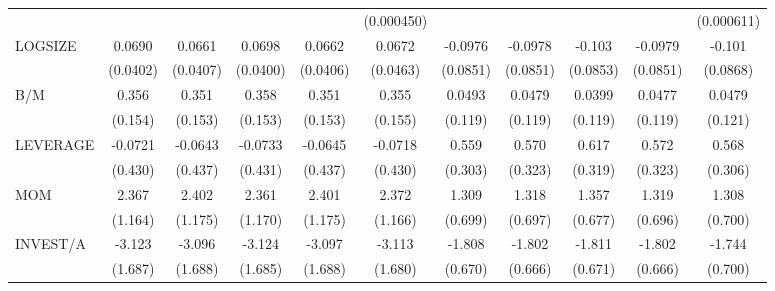 \begin{table}[htbp]
\begin{tabular}{l*{10}{c}}
                &                  &                  &                  &                  &(0.000450)         &                  &                  &                  &                  &(0.000611)         \\
LOGSIZE         &   0.0690\sym{*}  &   0.0661         &   0.0698\sym{*}  &   0.0662         &   0.0672         &  -0.0976         &  -0.0978         &   -0.103         &  -0.0979         &   -0.101         \\
                & (0.0402)         & (0.0407)         & (0.0400)         & (0.0406)         & (0.0463)         & (0.0851)         & (0.0851)         & (0.0853)         & (0.0851)         & (0.0868)         \\
B/M             &    0.356\sym{**} &    0.351\sym{**} &    0.358\sym{**} &    0.351\sym{**} &    0.355\sym{**} &   0.0493         &   0.0479         &   0.0399         &   0.0477         &   0.0479         \\
                &  (0.154)         &  (0.153)         &  (0.153)         &  (0.153)         &  (0.155)         &  (0.119)         &  (0.119)         &  (0.119)         &  (0.119)         &  (0.121)         \\
LEVERAGE        &  -0.0721         &  -0.0643         &  -0.0733         &  -0.0645         &  -0.0718         &    0.559\sym{*}  &    0.570\sym{*}  &    0.617\sym{*}  &    0.572\sym{*}  &    0.568\sym{*}  \\
                &  (0.430)         &  (0.437)         &  (0.431)         &  (0.437)         &  (0.430)         &  (0.303)         &  (0.323)         &  (0.319)         &  (0.323)         &  (0.306)         \\
MOM             &    2.367\sym{**} &    2.402\sym{**} &    2.361\sym{**} &    2.401\sym{**} &    2.372\sym{**} &    1.309\sym{*}  &    1.318\sym{*}  &    1.357\sym{**} &    1.319\sym{*}  &    1.308\sym{*}  \\
                &  (1.164)         &  (1.175)         &  (1.170)         &  (1.175)         &  (1.166)         &  (0.699)         &  (0.697)         &  (0.677)         &  (0.696)         &  (0.700)         \\
INVEST/A        &   -3.123\sym{*}  &   -3.096\sym{*}  &   -3.124\sym{*}  &   -3.097\sym{*}  &   -3.113\sym{*}  &   -1.808\sym{***}&   -1.802\sym{***}&   -1.811\sym{***}&   -1.802\sym{***}&   -1.744\sym{**} \\
                &  (1.687)         &  (1.688)         &  (1.685)         &  (1.688)         &  (1.680)         &  (0.670)         &  (0.666)         &  (0.671)         &  (0.666)         &  (0.700)         \\

\end{tabular}
\end{table}
